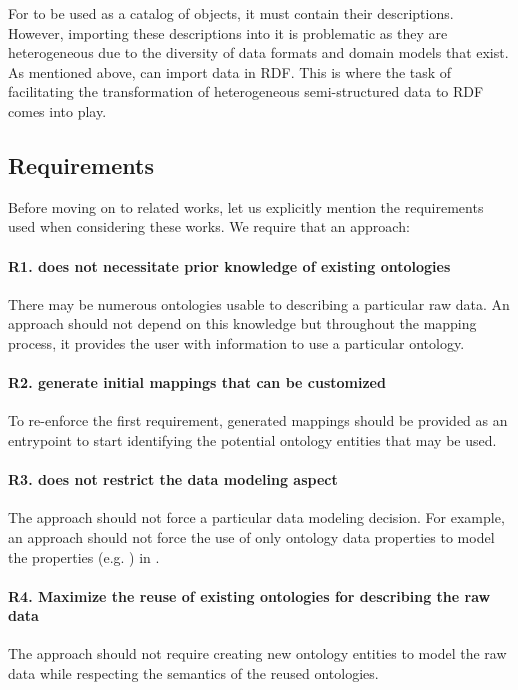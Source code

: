 For \thingin to be used as a catalog of objects, it must contain their descriptions. However, importing these descriptions into it is problematic as they are heterogeneous due to the diversity of data formats and domain models that exist. As mentioned above, \thingin can import data in RDF. This is where the task of facilitating the transformation of heterogeneous semi-structured data to RDF comes into play.



\subsection{Requirements}\label{sec:requirements}
Before moving on to related works, let us explicitly mention the requirements used when considering these works. We require that an approach:

\paragraph{\textbf{R1. does not necessitate prior knowledge of existing ontologies}} There may be numerous ontologies usable to describing a particular raw data. An approach should not depend on this knowledge but throughout the mapping process, it provides the user with information to use a particular ontology. 

\paragraph{\textbf{R2. generate initial mappings that can be customized}} To re-enforce the first requirement, generated mappings should be provided as an entrypoint to start identifying the potential ontology entities that may be used. 


\paragraph{\textbf{R3. does not restrict the data modeling aspect}} The approach should not force a particular data modeling decision. For example, an approach should not force the use of only ontology data properties to model the properties (e.g. ) in \rawData.

\paragraph{\textbf{R4. Maximize the reuse of existing ontologies for describing the raw data}} The approach should not require creating new ontology entities to model the raw data while respecting the semantics of the reused ontologies. 

